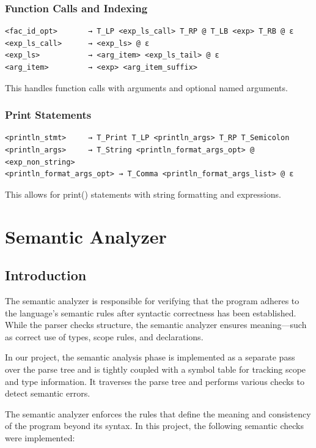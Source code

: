 \documentclass[12pt, a4paper]{report}
\begin{document}
\subsection{Function Calls and Indexing}
\begin{lstlisting}
<fac_id_opt>       → T_LP <exp_ls_call> T_RP @ T_LB <exp> T_RB @ ε
<exp_ls_call>      → <exp_ls> @ ε
<exp_ls>           → <arg_item> <exp_ls_tail> @ ε
<arg_item>         → <exp> <arg_item_suffix>
\end{lstlisting}
This handles function calls with arguments and optional named arguments.

\subsection{Print Statements}
\begin{lstlisting}
<println_stmt>     → T_Print T_LP <println_args> T_RP T_Semicolon
<println_args>     → T_String <println_format_args_opt> @ <exp_non_string>
<println_format_args_opt> → T_Comma <println_format_args_list> @ ε
\end{lstlisting}

This allows for print() statements with string formatting and expressions.



\chapter{Semantic Analyzer}


\section{Introduction}

The semantic analyzer is responsible for verifying that the program adheres to the language's semantic rules after syntactic correctness has been established. While the parser checks structure, the semantic analyzer ensures meaning—such as correct use of types, scope rules, and declarations.

In our project, the semantic analysis phase is implemented as a separate pass over the parse tree and is tightly coupled with a symbol table for tracking scope and type information. It traverses the parse tree and performs various checks to detect semantic errors.

The semantic analyzer enforces the rules that define the meaning and consistency of the program beyond its syntax. In this project, the following semantic checks were implemented:
\end{document}
